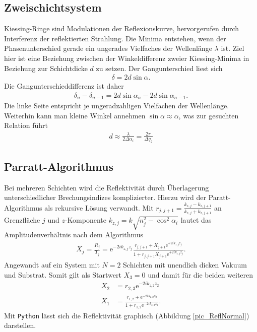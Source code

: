 \subsection{Zweischichtsystem}
Kiessing-Ringe sind Modulationen der Reflexionskurve, hervorgerufen durch Interferenz der reflektierten Strahlung. Die Minima entstehen, wenn der 
Phasenunterschied gerade ein ungerades Vielfaches der Wellenlänge $\lambda$ ist. Ziel hier ist eine Beziehung zwischen der Winkeldifferenz zweier Kiessing-Minima 
in Beziehung zur Schichtdicke $d$ zu setzen. Der Gangunterschied liest sich
\begin{align}
 \delta = 2 d \sin\alpha.
\end{align}
Die Gangunterschieddifferenz ist daher
\begin{align}
 \delta_n -\delta_{n-1}= 2 d \sin\alpha_n - 2d\sin\alpha_{n-1}.
\end{align}
Die linke Seite entspricht je ungeradzahligen Vielfachen der Wellenlänge. Weiterhin kann man kleine Winkel annehmen $\sin\alpha \approx \alpha$, was zur
gesuchten Relation führt
\begin{align}
 d \approx \frac{\lambda}{2\Delta\alpha_i} = \frac{2\pi}{\Delta q_z}
\end{align}

\subsection{Parratt-Algorithmus}
Bei mehreren Schichten wird die Reflektivität durch Überlagerung unterschiedlicher Brechungsindizes komplizierter. Hierzu wird der Paratt-Algorithmus als
rekursive Lösung verwandt. Mit $r_{j,j+1} = \frac{k_{z,j}-k_{z,j+1}}{k_{z,j}+k_{z,j+1}}$ an Grenzfläche $j$ und $z$-Komponente $k_{z,j} = k\sqrt{n_j^2-\cos^2\alpha_i}$
lautet das Amplitudenverhältnis nach dem Algorithmus
\begin{align}
 X_j = \frac{R_j}{T_j} = \text{e}^{-2ik_{z,j}z_j}\frac{r_{j,j+1} + X_{j+1} \text{e}^{+2ik_{z,j}z_j}}{1 + r_{j,j+1} X_{j+1}\text{e}^{+2ik_{z,j}z_j}}.
\end{align}
Angewandt auf ein System mit $N=2$ Schichten mit unendlich dicken Vakuum und Substrat. Somit gilt als Startwert $X_3 = 0$ und damit für die beiden weiteren
\begin{align}
 X_2 &= r_{2,3}\text{e}^{-2ik_{z,2}z_2}\\
 X_1 &= \frac{r_{1,2}+\text{e}^{-2ik_{z,2}z_2}}{1+r_{1,2}\text{e}^{-2ik_{z,2}z_2}}.
\end{align}
Mit \texttt{Python} lässt sich die Reflektivität graphisch (Abbildung \ref{pic_ReflNormal}) darstellen.


